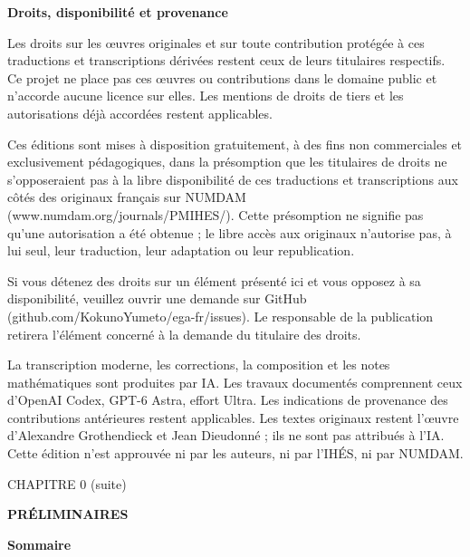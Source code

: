 \documentclass[10pt,oneside]{book}
\newcommand{\oldpage}[2][]{%
  \setcounter{footnote}{0}%
  \marginpar{\scriptsize\textbf{#1}~|~#2}\ignorespaces}
\begin{document}
\clearpage
\begingroup
\small
\noindent\textbf{Droits, disponibilité et provenance}

Les droits sur les œuvres originales et sur toute contribution protégée à ces traductions et transcriptions dérivées restent ceux de leurs titulaires respectifs. Ce projet ne place pas ces œuvres ou contributions dans le domaine public et n'accorde aucune licence sur elles. Les mentions de droits de tiers et les autorisations déjà accordées restent applicables.

Ces éditions sont mises à disposition gratuitement, à des fins non commerciales et exclusivement pédagogiques, dans la présomption que les titulaires de droits ne s'opposeraient pas à la libre disponibilité de ces traductions et transcriptions aux côtés des originaux français sur NUMDAM (www.numdam.org/journals/PMIHES/). Cette présomption ne signifie pas qu'une autorisation a été obtenue ; le libre accès aux originaux n'autorise pas, à lui seul, leur traduction, leur adaptation ou leur republication.

Si vous détenez des droits sur un élément présenté ici et vous opposez à sa disponibilité, veuillez ouvrir une demande sur GitHub (github.com/KokunoYumeto/ega-fr/issues). Le responsable de la publication retirera l'élément concerné à la demande du titulaire des droits.

La transcription moderne, les corrections, la composition et les notes mathématiques sont produites par IA. Les travaux documentés comprennent ceux d'OpenAI Codex, GPT-6 Astra, effort Ultra. Les indications de provenance des contributions antérieures restent applicables. Les textes originaux restent l'œuvre d'Alexandre Grothendieck et Jean Dieudonné ; ils ne sont pas attribués à l'IA. Cette édition n'est approuvée ni par les auteurs, ni par l'IHÉS, ni par NUMDAM.
\par
\endgroup
\clearpage

%
\clearpage
\thispagestyle{plain}
\oldpage[IV-1]{5}
\label{chapter:0IV1-fr}

\begin{center}
{\large CHAPITRE 0 (suite)\footnotemark\par}
\vspace{1.5em}
{\Large\bfseries PRÉLIMINAIRES\par}
\vspace{2em}
{\large\bfseries Sommaire\par}
\end{center}
\end{document}
